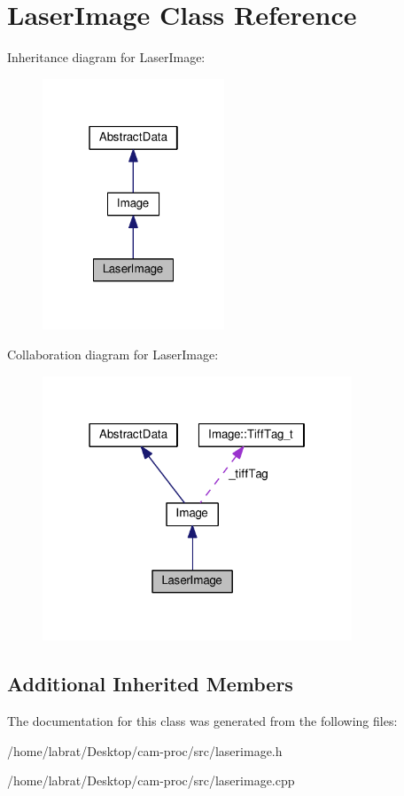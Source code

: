 \hypertarget{classLaserImage}{}\section{Laser\+Image Class Reference}
\label{classLaserImage}


Inheritance diagram for Laser\+Image\+:\nopagebreak
\begin{figure}[H]
\begin{center}
\leavevmode
\includegraphics[width=154pt]{classLaserImage__inherit__graph}
\end{center}
\end{figure}


Collaboration diagram for Laser\+Image\+:\nopagebreak
\begin{figure}[H]
\begin{center}
\leavevmode
\includegraphics[width=262pt]{classLaserImage__coll__graph}
\end{center}
\end{figure}
\subsection*{Additional Inherited Members}


The documentation for this class was generated from the following files\+:\begin{DoxyCompactItemize}
\item 
/home/labrat/\+Desktop/cam-\/proc/src/laserimage.\+h\item 
/home/labrat/\+Desktop/cam-\/proc/src/laserimage.\+cpp\end{DoxyCompactItemize}
